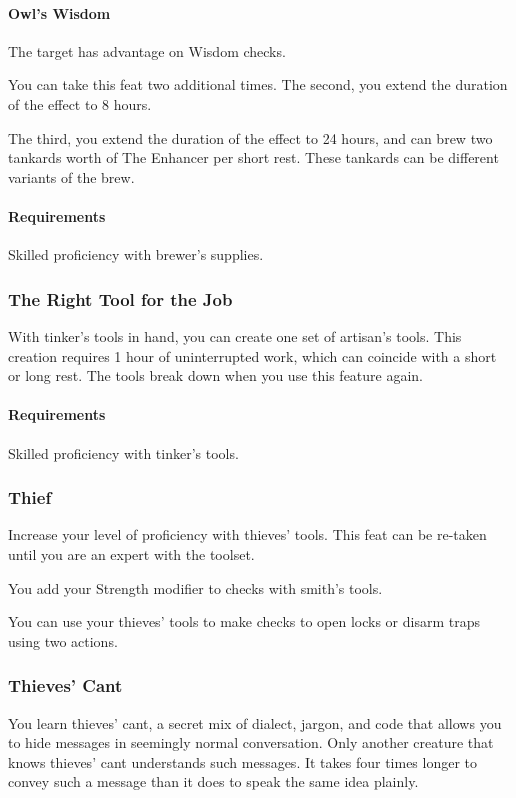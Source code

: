     \paragraph{Owl's Wisdom} The target has advantage on Wisdom checks.

    You can take this feat two additional times.
    The second, you extend the duration of the effect to 8 hours.

    The third, you extend the duration of the effect to 24 hours, and can brew two tankards worth of The Enhancer per short rest.
    These tankards can be different variants of the brew.
    \paragraph{Requirements} Skilled proficiency with brewer's supplies.
\subsubsection{The Right Tool for the Job} \label{feat::therighttoolforthejob}
    With tinker's tools in hand, you can create one set of artisan's tools.
    This creation requires 1 hour of uninterrupted work, which can coincide with a short or long rest.
    The tools break down when you use this feature again.
    \paragraph{Requirements} Skilled proficiency with tinker's tools.
\subsubsection{Thief} \label{feat::thief}
    Increase your level of proficiency with thieves' tools.
    This feat can be re-taken until you are an expert with the toolset.

    You add your Strength modifier to checks with smith's tools.

    You can use your thieves' tools to make checks to open locks or disarm traps using two actions.
\subsubsection{Thieves' Cant} \label{feat::thievescant}
    You learn thieves' cant, a secret mix of dialect, jargon, and code that allows you to hide messages in seemingly normal conversation.
    Only another creature that knows thieves' cant understands such messages.
    It takes four times longer to convey such a message than it does to speak the same idea plainly.


